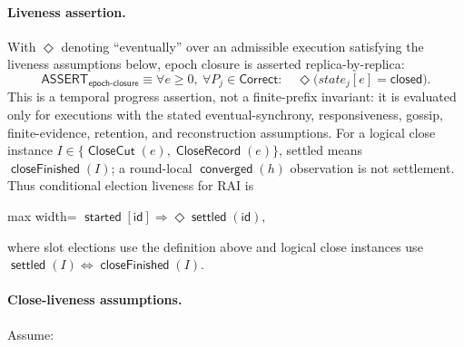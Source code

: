 \documentclass[sigplan,twocolumn,review,anonymous]{acmart}
\newcommand{\func}[1]{\operatorname{\mathsf{#1}}}
\newcommand{\id}{\mathsf{id}}
\newcommand{\CloseCut}{\func{CloseCut}}
\newcommand{\CloseRecord}{\func{CloseRecord}}
\newcommand{\closeFinished}{\func{closeFinished}}
\newcommand{\started}{\func{started}}
\newcommand{\converged}{\func{converged}}
\begin{document}
\paragraph{Liveness assertion.}
With \(\Diamond\) denoting ``eventually'' over an admissible execution satisfying the liveness
assumptions below, epoch closure is asserted replica-by-replica:
\[
\mathsf{ASSERT}_{\mathsf{epoch\mbox{-}closure}}\equiv
\forall e\ge0,\ \forall P_j\in\mathsf{Correct}:\quad
\Diamond\bigl(state_j[e]=\mathsf{closed}\bigr).
\]
This is a temporal progress assertion, not a finite-prefix invariant: it is evaluated only for
executions with the stated eventual-synchrony, responsiveness, gossip, finite-evidence, retention, and
reconstruction assumptions.
For a logical close instance \(I\in\{\CloseCut(e),\CloseRecord(e)\}\), settled means
\(\closeFinished(I)\); a round-local \(\converged(h)\) observation is not settlement.  Thus
conditional election liveness for RAI is
\begin{center}
\begin{adjustbox}{max width=\columnwidth}
\(\displaystyle
\started[\id]\Rightarrow \Diamond\func{settled}(\id),
\)
\end{adjustbox}
\end{center}
where slot elections use the definition above and logical close instances use
\(\func{settled}(I)\iff\closeFinished(I)\).

\paragraph{Close-liveness assumptions.}
Assume:
\end{document}
